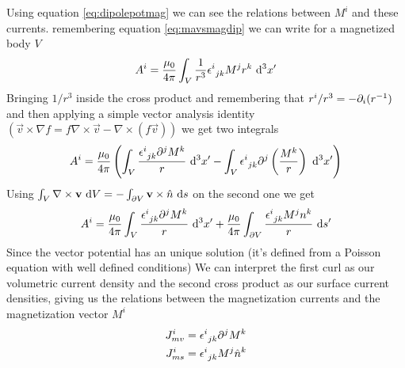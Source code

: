 \documentclass[../electromagnetism.tex]{subfiles}
\begin{document}
Using equation \eqref{eq:dipolepotmag} we can see the relations between $M^i$ and these currents. remembering equation \eqref{eq:mavsmagdip} we can write for a magnetized body $V$
\begin{equation}
	A^i=\frac{\mu_0}{4\pi}\int_V\frac{1}{r^3}\epsilon^{i}_{\ jk}M^jr^k\ \mathrm{d}^3x'
	\label{eq:magpotmagnet}
\end{equation}
Bringing $1/r^3$ inside the cross product and remembering that $r^i/r^3=-\partial_i(r^{-1})$ and then applying a simple vector analysis identity $(\vec{v}\times\nabla f=f\nabla\times\vec{v}-\nabla\times(f\vec{v}))$ we get two integrals
\begin{equation}
	A^i=\frac{\mu_0}{4\pi}\left( \int_V\frac{\epsilon^{i}_{\ jk}\partial^jM^k}{r}\ \mathrm{d}^3x'-\int_V\epsilon^{i}_{\ jk}\partial^j\left( \frac{M^k}{r} \right)\ \mathrm{d}^3x' \right)
	\label{eq:vecpotvsmagint}
\end{equation}
Using $\int_V \nabla\times\mathbf{v}\ \mathrm{d} V=-\int_{\partial V}\mathbf{v}\times\hat{n}\ \mathrm{d} s$ on the second one we get
\begin{equation}
	A^i=\frac{\mu_0}{4\pi}\int_V\frac{\epsilon^{i}_{\ jk}\partial^jM^k}{r}\ \mathrm{d}^3x'+\frac{\mu_0}{4\pi}\int_{\partial V}\frac{\epsilon^{i}_{\ jk}M^jn^k}{r}\ \mathrm{d} s'
	\label{eq:vecpotfinM}
\end{equation}
Since the vector potential has an unique solution (it's defined from a Poisson equation with well defined conditions) We can interpret the first curl as our volumetric current density and the second cross product as our surface current densities, giving us the relations between the magnetization currents and the magnetization vector $M^i$
\begin{equation}
	\begin{aligned}
		J^i_{mv}&=\epsilon^{i}_{\ jk}\partial^jM^k\\
		J^i_{ms}&=\epsilon^{i}_{\ jk}M^j\hat{n}^k
	\end{aligned}
	\label{eq:magcurrentsvsM}
\end{equation}
\end{document}
